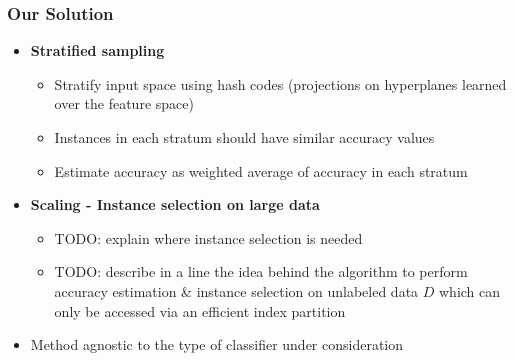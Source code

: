 \documentclass[11pt]{beamer}
\newlength{\wideitemsep}
\let\olditem\item
\renewcommand{\item}{\setlength{\itemsep}{\wideitemsep}\olditem}
\begin{document}
\begin{frame}
\frametitle{Our Solution}
\begin{itemize}
\item \textbf{Stratified sampling}
\begin{itemize}
\item Stratify input space using hash codes (projections on hyperplanes learned over the feature space)
\item Instances in each stratum should have similar accuracy values 
\item Estimate accuracy as weighted average of accuracy in each stratum
\end{itemize}
\item \textbf{Scaling - Instance selection on large data} 
\begin{itemize}
\item TODO: explain where instance selection is needed
\item TODO: describe in a line the idea behind the algorithm to perform accuracy estimation \& instance selection on unlabeled data $D$ which can only be accessed via an efficient index partition 
\end{itemize}
\item Method agnostic to the type of classifier under consideration
\end{itemize} 
\end{frame}

\end{document}
